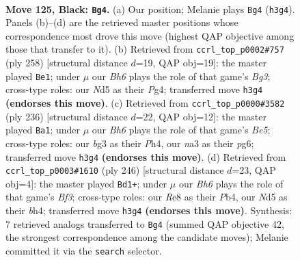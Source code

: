 \documentclass[11pt]{article}
\begin{document}
\clearpage

\begin{figure}[p]\centering
\begin{subfigure}{0.46\textwidth}\centering
\resizebox{\linewidth}{!}{%
\newchessgame
\chessboard[
  setfen={4r3/1k5K/p7/P2n1p2/8/N5Bb/8/7R b - - 0 125},
  showmover=false,
  pgfstyle=straightmove, color=movearrow, markmove={h3-g4}
]}
\caption{}
\end{subfigure}\hfill
\begin{subfigure}{0.46\textwidth}\centering
\resizebox{\linewidth}{!}{%
\newchessgame
\chessboard[
  setfen={4R3/8/6p1/3k4/5KPP/6B1/2b5/6r1 w - - 29 130},
  showmover=false,
  pgfstyle=straightmove, color=movearrow, markmove={g3-e1}
]}
\caption{}
\end{subfigure}
\\[4pt]
\begin{subfigure}{0.46\textwidth}\centering
\resizebox{\linewidth}{!}{%
\newchessgame
\chessboard[
  setfen={4k3/R7/4n1p1/3rBp2/7P/5PP1/8/5K2 w - - 23 119},
  showmover=false,
  pgfstyle=straightmove, color=movearrow, markmove={e5-a1}
]}
\caption{}
\end{subfigure}\hfill
\begin{subfigure}{0.46\textwidth}\centering
\resizebox{\linewidth}{!}{%
\newchessgame
\chessboard[
  setfen={8/8/3p4/3P4/kP3p1b/2PK1B2/8/8 w - - 53 124},
  showmover=false,
  pgfstyle=straightmove, color=movearrow, markmove={f3-d1}
]}
\caption{}
\end{subfigure}
\caption{\textbf{Move 125, Black: \texttt{Bg4}.} (a) Our position; Melanie plays \texttt{Bg4} (\texttt{h3g4}). Panels (b)--(d) are the retrieved master positions whose correspondence most drove this move (highest QAP objective among those that transfer to it). (b) Retrieved from \texttt{ccrl\_top\_p0002\#757} (ply 258) [structural distance $d$=19, QAP obj=19]: the master played \texttt{Be1}; under $\mu$ our \emph{Bh6} plays the role of that game's \emph{Bg3}; cross-type roles: our \emph{N}d5 as their \emph{P}g4; transferred move \texttt{h3g4} \textbf{(endorses this move)}. (c) Retrieved from \texttt{ccrl\_top\_p0000\#3582} (ply 236) [structural distance $d$=22, QAP obj=12]: the master played \texttt{Ba1}; under $\mu$ our \emph{Bh6} plays the role of that game's \emph{Be5}; cross-type roles: our \emph{b}g3 as their \emph{P}h4, our \emph{n}a3 as their \emph{p}g6; transferred move \texttt{h3g4} \textbf{(endorses this move)}. (d) Retrieved from \texttt{ccrl\_top\_p0003\#1610} (ply 246) [structural distance $d$=23, QAP obj=4]: the master played \texttt{Bd1+}; under $\mu$ our \emph{Bh6} plays the role of that game's \emph{Bf3}; cross-type roles: our \emph{R}e8 as their \emph{P}b4, our \emph{N}d5 as their \emph{b}h4; transferred move \texttt{h3g4} \textbf{(endorses this move)}. Synthesis: 7 retrieved analogs transferred to \texttt{Bg4} (summed QAP objective 42, the strongest correspondence among the candidate moves); Melanie committed it via the \texttt{search} selector.}
\label{fig:thought-m249}
\end{figure}
\end{document}
